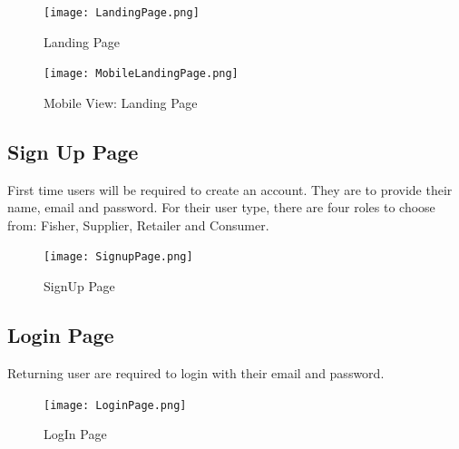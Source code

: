 	\begin{figure}[H]
		\centering
		\texttt{[image: LandingPage.png]}
		\caption{Landing Page}
		\label{fig:landing_page}
	\end{figure}
	
	\begin{figure}[H]
		\centering
		\texttt{[image: MobileLandingPage.png]}
		\caption{Mobile View: Landing Page}
		\label{fig:mobile_landing_page}
	\end{figure}	

\subsection{Sign Up Page}
First time users will be required to create an account. They are to provide their name, email and password. For their user type, there are four roles to choose from: Fisher, Supplier, Retailer and Consumer. 

	\begin{figure}[H]
		\centering
		\texttt{[image: SignupPage.png]}
		\caption{SignUp Page}
		\label{fig:signup_page}
	\end{figure}

\subsection{Login Page}
Returning user are required to login with their email and password.

	\begin{figure}[H]
		\centering
		\texttt{[image: LoginPage.png]}
		\caption{LogIn Page}
		\label{fig:login_page}
	\end{figure}

